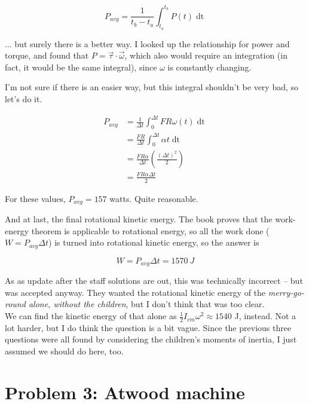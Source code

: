 \documentclass[12pt,a4paper]{report}
\begin{document}
\begin{equation}
P_{avg} = \frac{1}{t_b - t_a} \int_{t_a}^{t_b} P(t) \mathop{dt}
\end{equation}

... but surely there is a better way. I looked up the relationship for power and torque, and found that $P = \vec{\tau} \cdot \vec{\omega}$, which also would require an integration (in fact, it would be the same integral), since $\omega$ is constantly changing.

I'm not sure if there is an easier way, but this integral shouldn't be very bad, so let's do it.

\begin{align}
P_{avg} &= \frac{1}{\Delta t} \int_{0}^{\Delta t} F R \omega(t) \mathop{dt}\\
        &= \frac{F R}{\Delta t} \int_{0}^{\Delta t} \alpha t \mathop{dt}\\
        &= \frac{F R \alpha}{\Delta t} \left(\frac{(\Delta t)^2}{2}\right)\\
        &= \frac{F R \alpha \Delta t}{2}
\end{align}

For these values, $P_{avg} = 157$ watts. Quite reasonable.

And at last, the final rotational kinetic energy. The book proves that the work-energy theorem is applicable to rotational energy, so all the work done ($W = P_{avg} \Delta t$) is turned into rotational kinetic energy, so the answer is 

\begin{equation}
W = P_{avg} \Delta t = \SI{1570}{J}
\end{equation}

As as update after the staff solutions are out, this was technically incorrect -- but was accepted anyway. They wanted the rotational kinetic energy of the \emph{merry-go-round alone, without the children}, but I don't think that was too clear.\\
We can find the kinetic energy of that alone as $\displaystyle \frac{1}{2} I_{cm} \omega^2 \approx 1540$ J, instead. Not a lot harder, but I do think the question is a bit vague. Since the previous three questions were all found by considering the children's moments of inertia, I just assumed we should do here, too.

\section{Problem 3: Atwood machine}
\end{document}
